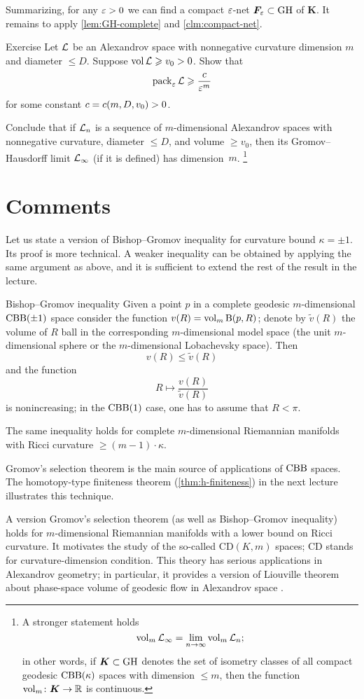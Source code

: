 Summarizing, for any $\varepsilon>0$ we can find a compact $\varepsilon$-net $\bm{F}_\varepsilon\subset \operatorname{\rm GH}\nolimits$ of $\bm{K}$.
It remains to apply \ref{lem:GH-complete} and \ref{clm:compact-net}.
\qeds

\begin{thm}{Exercise}\label{ex:pack-vol}
Let $\mathcal{L}$ be an Alexandrov space with nonnegative curvature dimension $m$ and diameter $\le D$.
Suppose $\operatorname{\rm vol}\nolimits\mathcal{L}\geqslant v_0>0$.
Show that 
\[\operatorname{\rm pack}\nolimits_\varepsilon\mathcal{L}\geqslant \frac{c}{\varepsilon^m}\]
for some constant $c=c(m,D,v_0)>0$.

Conclude that if $\mathcal{L}_n$ is a sequence of $m$-dimensional Alexandrov spaces with nonnegative curvature, diameter $\le D$, and volume $\ge v_0$, then its Gromov--Hausdorff limit $\mathcal{L}_\infty$ (if it is defined) has dimension~$m$.%
\footnote{A stronger statement holds 
\[\operatorname{\rm vol}\nolimits_m\mathcal{L}_\infty=\lim_{n\to\infty} \operatorname{\rm vol}\nolimits_m\mathcal{L}_n;\]
in other words, if $\bm{K}\subset \operatorname{\rm GH}\nolimits$ denotes the set of isometry classes of all compact geodesic $\mathrm{CBB}(\kappa)$ spaces with dimension $\le m$, then the function
$\operatorname{\rm vol}\nolimits_m\colon\bm{K}\to \mathbb{R}$ is continuous.}
\end{thm}

\section{Comments}

Let us state a version of Bishop--Gromov inequality for curvature bound $\kappa=\pm1$.
Its proof is more technical.
A weaker inequality can be obtained by applying the same argument as above,
and it is sufficient to extend the rest of the result in the lecture.

\begin{thm}{Bishop--Gromov inequality}
Given a point $p$ in a complete geodesic $m$-dimensional $\mathrm{CBB}(\pm1)$ space consider the function $v(R)\z=\vol_m\oBall(p,R)$;
denote by $\tilde v(R)$ the volume of $R$ ball in the corresponding $m$-dimensional model space (the unit $m$-dimensional sphere or the $m$-dimensional Lobachevsky space).
Then 
\[v(R)\le \tilde v(R)\]
and the function 
\[R\mapsto \frac{v(R)}{\tilde v(R)}\] is nonincreasing;
in the $\mathrm{CBB}(1)$ case, one has to assume that $R<\pi$.
\end{thm}

The same inequality holds for complete $m$-dimensional Riemannian manifolds with Ricci curvature $\ge (m-1)\cdot \kappa$.

Gromov's selection theorem is the main source of applications of $\mathrm{CBB}$ spaces.
The homotopy-type finiteness theorem (\ref{thm:h-finiteness}) in the next lecture illustrates this technique.

A version Gromov's selection theorem (as well as Bishop--Gromov inequality) holds for $m$-dimensional Riemannian manifolds with a lower bound on Ricci curvature.
It motivates the study of the so-called $\mathrm{CD}(K,m)$ spaces; $\mathrm{CD}$ stands for curvature-dimension condition.
This theory has serious applications in Alexandrov geometry;
in particular, it provides a version of Liouville theorem about phase-space volume of geodesic flow in Alexandrov space \cite{brue-mondino-semola}.
